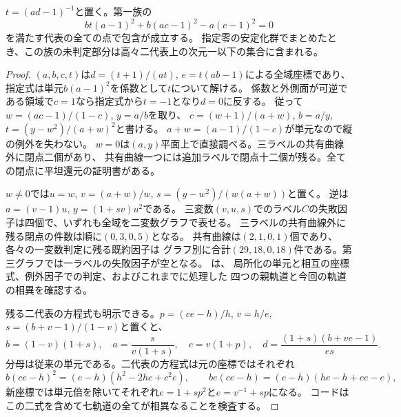 \begin{proposition}[一零第一族の平方差の代表]
\label{prop:ou-one-zero-first-square-difference}
$t=(ad-1)^{-1}$と置く。第一族の
\[
       bt(a-1)^2+b(ac-1)^2-a(c-1)^2=0
\]
を満たす代表の全ての点で包含が成立する。
指定零の安定化群でまとめたとき、この族の未判定部分は高々二代表上の次元一以下の集合に含まれる。
\end{proposition}
\begin{proof}
$(a,b,c,t)$は$d=(t+1)/(at)$, $e=t(ab-1)$による全域座標であり、
指定式は単元$b(a-1)^2$を係数として$t$について解ける。
係数と外側面が可逆である領域で$c=1$なら指定式から$t=-1$となり$d=0$に反する。
従って$w=(ac-1)/(1-c)$, $y=a/b$を取り、
$c=(w+1)/(a+w)$, $b=a/y$, $t=(y-w^2)/(a+w)^2$と書ける。
$a+w=(a-1)/(1-c)$が単元なので縦の例外を失わない。
$w=0$は$(a,y)$平面上で直接調べる。三ラベルの共有曲線外に閉点二個があり、
共有曲線一つには追加ラベルで閉点十二個が残る。全ての閉点に平坦還元の証明書がある。

$w\ne0$では$u=w$, $v=(a+w)/w$, $s=(y-w^2)/(w(a+w))$と置く。
逆は$a=(v-1)u$, $y=(1+sv)u^2$である。
三変数$(v,u,s)$でのラベル$C$の失敗因子は四個で、いずれも全域を二変数グラフで表せる。
三ラベルの共有曲線外に残る閉点の件数は順に$(0,3,0,5)$となる。
共有曲線は$(2,1,0,1)$個であり、各々の一変数判定に残る既約因子は
グラフ別に合計$(29,18,0,18)$件である。第三グラフでは一ラベルの失敗因子が空となる。
は、
局所化の単元と相互の座標式、例外因子での判定、およびこれまでに処理した
四つの親軌道と今回の軌道の相異を確認する。

残る二代表の方程式も明示できる。$p=(ce-h)/h$, $v=h/e$, $s=(b+v-1)/(1-v)$と置くと、
\[
   b=(1-v)(1+s),\quad a=\frac{s}{v(1+s)},\quad c=v(1+p),\quad
   d=\frac{(1+s)(b+ve-1)}{es}.
\]
分母は従来の単元である。二代表の方程式は元の座標ではそれぞれ
\[
 b(ce-h)^2=(e-h)(h^2-2hc+c^2e),\qquad
 be(ce-h)=(e-h)(he-h+ce-e),
\]
新座標では単元倍を除いてそれぞれ$e=1+sp^2$と$e=v^{-1}+sp$になる。
コードはこの二式を含めて七軌道の全てが相異なることを検査する。

\end{proof}

